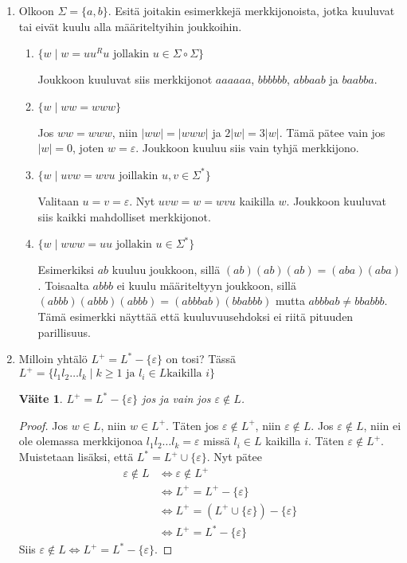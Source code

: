 \documentclass[a4paper,11pt]{article}
\newtheorem*{vaite}{Väite}
\begin{document}
\begin{enumerate}
\item
  Olkoon $\Sigma = \{a,b\}$. Esitä joitakin esimerkkejä
  merkkijonoista, jotka kuuluvat tai eivät kuulu alla määriteltyihin
  joukkoihin.
  \begin{enumerate}
    \item
      $\{w \mid w = uu^Ru \text{ jollakin } u \in \Sigma \circ
      \Sigma\}$

      Joukkoon kuuluvat siis merkkijonot $aaaaaa$, $bbbbbb$, $abbaab$
      ja $baabba$.
    \item
      $\{w \mid ww = www\}$

      Jos $ww = www$, niin $|ww| = |www|$ ja $2|w| = 3|w|$.
      Tämä pätee vain jos $|w| = 0$, joten $w = \varepsilon$. Joukkoon
      kuuluu siis vain tyhjä merkkijono.
    \item
      $\{w \mid uvw = wvu \text{ joillakin } u,v \in \Sigma^*\}$

      Valitaan $u = v = \varepsilon$. Nyt $uvw = w = wvu$ kaikilla
      $w$. Joukkoon kuuluvat siis kaikki mahdolliset merkkijonot.
    \item
      $\{w \mid www = uu \text{ jollakin } u \in \Sigma^*\}$

      Esimerkiksi $ab$ kuuluu joukkoon, sillä $(ab)(ab)(ab) =
      (aba)(aba)$. Toisaalta $abbb$ ei kuulu määriteltyyn joukkoon,
      sillä $(abbb)(abbb)(abbb) = (abbbab)(bbabbb)$ mutta $abbbab \neq
      bbabbb$. Tämä esimerkki näyttää että kuuluvuusehdoksi ei riitä
      pituuden parillisuus. 
  \end{enumerate}

\item
  Milloin yhtälö $L^+ = L^* - \{\varepsilon\}$ on tosi? Tässä $L^+ =
  \{l_1l_2 \ldots l_k \mid k \ge 1 \text{ ja } l_i \in L \text{
    kaikilla } i\}$
  \begin{vaite}
    $L^+ = L^* - \{\varepsilon\}$ jos ja vain jos $\varepsilon \notin L$.
  \end{vaite}
  \begin{proof}
      Jos $w \in L$, niin $w \in L^+$. Täten jos $\varepsilon \notin
      L^+$, niin $\varepsilon \notin L$. Jos $\varepsilon \notin L$,
      niin ei ole olemassa merkkijonoa $l_1l_2 \ldots l_k =
      \varepsilon$ missä $l_i \in L$ kaikilla $i$. Täten $\varepsilon
      \notin L^+$. Muistetaan lisäksi, että $L^* = L^+ \cup
      \{\varepsilon\}$. Nyt pätee
      \begin{align*}
        \varepsilon \notin L &\Leftrightarrow \varepsilon \notin L^+ \\
        &\Leftrightarrow L^+ = L^+ - \{\varepsilon\} \\
        &\Leftrightarrow L^+ = (L^+ \cup \{\varepsilon\}) -
        \{\varepsilon\} \\
        &\Leftrightarrow L^+ = L^* - \{\varepsilon\}
      \end{align*}
      Siis $\varepsilon \notin L \Leftrightarrow L^+ = L^* - \{\varepsilon\}$.
  \end{proof}


\end{enumerate}
\end{document}

